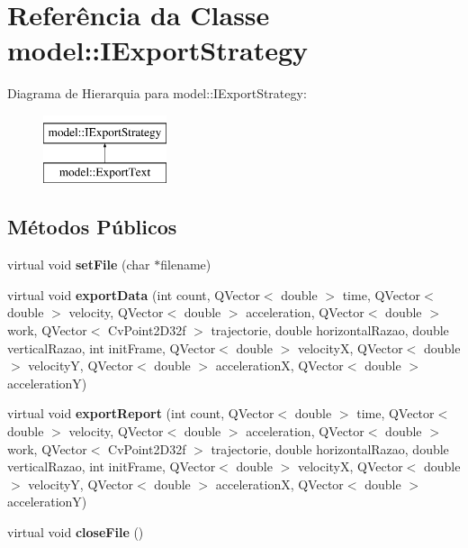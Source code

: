 \hypertarget{classmodel_1_1IExportStrategy}{
\section{Referência da Classe model::IExportStrategy}
\label{classmodel_1_1IExportStrategy}
}
Diagrama de Hierarquia para model::IExportStrategy:\begin{figure}[H]
\begin{center}
\leavevmode
\includegraphics[height=2.000000cm]{classmodel_1_1IExportStrategy}
\end{center}
\end{figure}
\subsection*{Métodos Públicos}
\begin{DoxyCompactItemize}
\item 
\hypertarget{classmodel_1_1IExportStrategy_aecac2597bc3e87a751ead9ac14ad52a1}{
virtual void {\bfseries setFile} (char $\ast$filename)}
\label{classmodel_1_1IExportStrategy_aecac2597bc3e87a751ead9ac14ad52a1}

\item 
\hypertarget{classmodel_1_1IExportStrategy_abf9201b5c3c376fcf14c14658d744329}{
virtual void {\bfseries exportData} (int count, QVector$<$ double $>$ time, QVector$<$ double $>$ velocity, QVector$<$ double $>$ acceleration, QVector$<$ double $>$ work, QVector$<$ CvPoint2D32f $>$ trajectorie, double horizontalRazao, double verticalRazao, int initFrame, QVector$<$ double $>$ velocityX, QVector$<$ double $>$ velocityY, QVector$<$ double $>$ accelerationX, QVector$<$ double $>$ accelerationY)}
\label{classmodel_1_1IExportStrategy_abf9201b5c3c376fcf14c14658d744329}

\item 
\hypertarget{classmodel_1_1IExportStrategy_a829d6500059dc9128a1d084781009dd0}{
virtual void {\bfseries exportReport} (int count, QVector$<$ double $>$ time, QVector$<$ double $>$ velocity, QVector$<$ double $>$ acceleration, QVector$<$ double $>$ work, QVector$<$ CvPoint2D32f $>$ trajectorie, double horizontalRazao, double verticalRazao, int initFrame, QVector$<$ double $>$ velocityX, QVector$<$ double $>$ velocityY, QVector$<$ double $>$ accelerationX, QVector$<$ double $>$ accelerationY)}
\label{classmodel_1_1IExportStrategy_a829d6500059dc9128a1d084781009dd0}

\item 
\hypertarget{classmodel_1_1IExportStrategy_a6197dfc572bc707ecdfe9932a61e73b6}{
virtual void {\bfseries closeFile} ()}
\label{classmodel_1_1IExportStrategy_a6197dfc572bc707ecdfe9932a61e73b6}

\end{DoxyCompactItemize}


